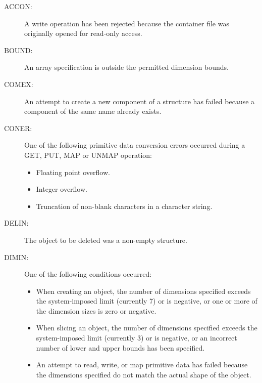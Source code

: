 \begin{description}

\item [ACCON:]
A write operation has been rejected because the container file was originally
opened for read-only access.

\item [BOUND:]
An array specification is outside the permitted dimension bounds.

\item [COMEX:]
An attempt to create a new component of a structure has failed because a
component of the same name already exists.

\item [CONER:]
One of the following primitive data conversion errors occurred during a 
GET, PUT, MAP or UNMAP operation:

\begin{itemize}

\item Floating point overflow.

\item Integer overflow.

\item Truncation of non-blank characters in a character string.

\end{itemize}

\item [DELIN:]
The object to be deleted was a non-empty structure.

\item [DIMIN:]
One of the following conditions occurred:

\begin{itemize}

\item When creating an object, the number of dimensions specified exceeds the
system-imposed limit (currently 7) or is negative, or one or more of the
dimension sizes is zero or negative.

\item When slicing an object, the number of dimensions specified exceeds the
system-imposed limit (currently 3) or is negative, or an incorrect number of
lower and upper bounds has been specified.

\item An attempt to read, write, or map primitive data has failed because the
dimensions specified do not match the actual shape of the object.

\end{itemize}


\end{description}
